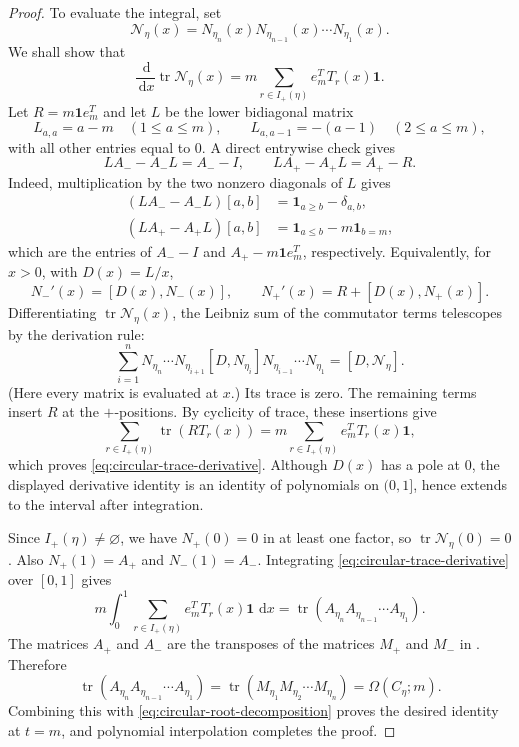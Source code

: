 \documentclass[11pt,letterpaper,reqno]{amsart}
\theoremstyle{definition}
\newcommand{\dd}{\,\mathrm{d}}
\begin{document}
\begin{proof}
To evaluate the integral, set
\[
\mathcal N_\eta(x)
=N_{\eta_n}(x)N_{\eta_{n-1}}(x)\cdots N_{\eta_1}(x).
\]
We shall show that
\begin{equation}\label{eq:circular-trace-derivative}
\frac{\dd}{\dd x}\operatorname{tr}\mathcal N_\eta(x)
=
m\sum_{r\in I_+(\eta)}e_m^T T_r(x)\mathbf 1.
\end{equation}
Let $R=m\mathbf 1 e_m^T$ and let \(L\) be the lower bidiagonal matrix
\[
L_{a,a}=a-m\quad(1\le a\le m),
\qquad
L_{a,a-1}=-(a-1)\quad(2\le a\le m),
\]
with all other entries equal to \(0\).  A direct entrywise check gives
\[
LA_- - A_-L=A_- - I,
\qquad
LA_+ - A_+L=A_+ - R.
\]
Indeed, multiplication by the two nonzero diagonals of \(L\) gives
\[
\begin{aligned}
(LA_--A_-L)[a,b]
 &=\mathbf 1_{a\ge b}-\delta_{a,b},\\
(LA_+-A_+L)[a,b]
 &=\mathbf 1_{a\le b}-m\mathbf 1_{b=m},
\end{aligned}
\]
which are the entries of \(A_--I\) and
\(A_+-m\mathbf 1e_m^T\), respectively.
Equivalently, for \(x>0\), with \(D(x)=L/x\),
\[
N_-'(x)=[D(x),N_-(x)],
\qquad
N_+'(x)=R+[D(x),N_+(x)].
\]
Differentiating \(\operatorname{tr}\mathcal N_\eta(x)\), the Leibniz sum of
the commutator terms telescopes by the derivation rule:
\[
\sum_{i=1}^{n}
 N_{\eta_n}\cdots N_{\eta_{i+1}}[D,N_{\eta_i}]
 N_{\eta_{i-1}}\cdots N_{\eta_1}
=[D,\mathcal N_\eta].
\]
(Here every matrix is evaluated at \(x\).)  Its trace is zero.  The remaining
terms insert \(R\) at the \(+\)-positions.  By cyclicity of trace, these
insertions give
\[
\sum_{r\in I_+(\eta)}
\operatorname{tr}\left(RT_r(x)\right)
=
m\sum_{r\in I_+(\eta)}e_m^T T_r(x)\mathbf 1,
\]
which proves \eqref{eq:circular-trace-derivative}.  Although \(D(x)\) has a
pole at \(0\), the displayed derivative identity is an identity of polynomials
on \((0,1]\), hence extends to the interval after integration.

Since \(I_+(\eta)\ne\varnothing\), we have \(N_+(0)=0\) in at least one factor,
so \(\operatorname{tr}\mathcal N_\eta(0)=0\).  Also
\(N_+(1)=A_+\) and \(N_-(1)=A_-\).  Integrating
\eqref{eq:circular-trace-derivative} over \([0,1]\) gives
\[
m\int_0^1\sum_{r\in I_+(\eta)} e_m^T T_r(x)\mathbf 1\,\dd x
=
\operatorname{tr}\left(A_{\eta_n}A_{\eta_{n-1}}\cdots A_{\eta_1}\right).
\]
The matrices \(A_+\) and \(A_-\) are the transposes of the matrices \(M_+\) and
\(M_-\) in .  Therefore
\[
\operatorname{tr}\left(A_{\eta_n}A_{\eta_{n-1}}\cdots A_{\eta_1}\right)
=
\operatorname{tr}\left(M_{\eta_1}M_{\eta_2}\cdots M_{\eta_n}\right)
=
\Omega(C_\eta;m).
\]
Combining this with \eqref{eq:circular-root-decomposition} proves the desired
identity at \(t=m\), and polynomial interpolation completes the proof.
\end{proof}
\end{document}
